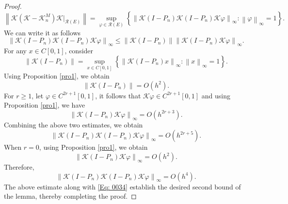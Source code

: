 \documentclass[10pt,a4paper]{amsart}
\newcommand{\norm}[1]{\left\lVert #1\right\rVert}
\begin{document}
\begin{proof}
\begin{equation*}
		\norm{\mathcal{K}(\mathcal{K} - \mathcal{K}_n^M) \mathcal{K} |_{\mathcal{R}(E)}} 
		= \sup_{\varphi \in \mathcal{R}(E)}\left\{\norm{ \mathcal{K} (I - P_n) \mathcal{K}(I - P_n)\mathcal{K}\varphi}_\infty : \norm{\varphi}_\infty =1 \right\}.
	\end{equation*}
	We can write it as follows
	\begin{equation*}
		\norm{\mathcal{K}(I - P_n) \mathcal{K}(I - P_n)\mathcal{K}\varphi}_\infty \leq\norm{\mathcal{K}(I - P_n)} \norm{\mathcal{K}(I - P_n)\mathcal{K}\varphi}_\infty.
	\end{equation*}
	For any \(x \in C[0,1]\), consider
	\begin{equation*}
		\norm{\mathcal{K}(I - P_n)} = \sup_{x \in C[0,1]}\left\{ \norm{\mathcal{K}(I - P_n)x}_\infty : \norm{x}_\infty =1 \right\}.
	\end{equation*}
	Using Proposition \ref{pro1}, we obtain
	\begin{equation*}
		\norm{\mathcal{K}(I - P_n)} = O\left(h^{2} \right).
	\end{equation*}
	For \(r \geq 1\), let \(\varphi \in C^{2r+1}[0,1]\), it follows that \(\mathcal{K}\varphi \in C^{2r+1}[0,1]\) and using Proposition \ref{pro1}, we have
	\begin{equation*}
		\norm{\mathcal{K}(I - P_n)\mathcal{K}\varphi}_\infty = O\left(h^{2r +3}\right).
	\end{equation*}
	Combining the above two estimates, we obtain 
	\begin{equation}  \label{Eq: 0034}
		\norm{\mathcal{K}(I - P_n) \mathcal{K}(I - P_n)\mathcal{K}\varphi}_\infty = 	O\left(h^{2r+5}\right).
	\end{equation}
	When \(r=0\), using Proposition \ref{pro1}, we obtain
	\begin{equation*}
		\norm{\mathcal{K}(I - P_n)\mathcal{K}\varphi}_\infty = O\left(h^{2}\right).
	\end{equation*}
	Therefore,
	\begin{equation*} 
		\norm{\mathcal{K}(I - P_n) \mathcal{K}(I - P_n)\mathcal{K}\varphi}_\infty = 	O\left(h^{4}\right).
	\end{equation*}
	The above estimate along with \eqref{Eq: 0034} establish the desired second bound of the lemma, thereby completing the proof.
\end{proof}
\end{document}
